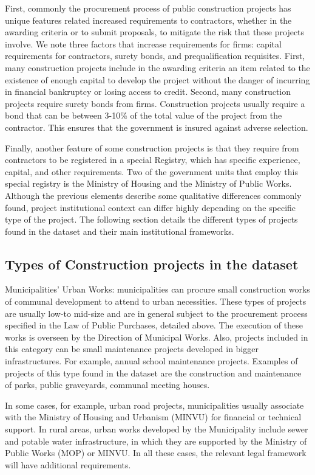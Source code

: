 First, commonly the procurement process of public construction projects has unique features related increased requirements to contractors, whether in the awarding criteria or to submit proposals, to mitigate the risk that these projects involve. We note three factors that increase requirements for firms: capital requirements for contractors, surety bonds, and prequalification requisites. First, many construction projects include in the awarding criteria an item related to the existence of enough capital to develop the project without the danger of incurring in financial bankruptcy or losing access to credit. Second, many construction projects require surety bonds from firms. Construction projects usually require a bond that can be between 3-10\% of the total value of the project from the contractor. This ensures that the government is insured against adverse selection.

Finally, another feature of some construction projects is that they require from contractors to be registered in a special Registry, which has specific experience, capital, and other requirements. Two of the government units that employ this special registry is the Ministry of Housing and the Ministry of Public Works.
Although the previous elements describe some qualitative differences commonly found, project institutional context can differ highly depending on the specific type of the project. The following section details the different types of projects found in the dataset and their main institutional frameworks.

\subsection{Types of Construction projects in the dataset}
Municipalities’ Urban Works: municipalities can procure small construction works of communal development to attend to urban necessities. These types of projects are usually low-to mid-size and are in general subject to the procurement process specified in the Law of Public Purchases, detailed above.  The execution of these works is overseen by the Direction of Municipal Works. Also, projects included in this category can be small maintenance projects developed in bigger infrastructures. For example, annual school maintenance projects.
Examples of projects of this type found in the dataset are the construction and maintenance of parks, public graveyards, communal meeting houses.

In some cases, for example, urban road projects, municipalities usually associate with the Ministry of Housing and Urbanism (MINVU) for financial or technical support. In rural areas, urban works developed by the Municipality include sewer and potable water infrastructure, in which they are supported by the Ministry of Public Works (MOP) or MINVU. In all these cases, the relevant legal framework will have additional requirements.

